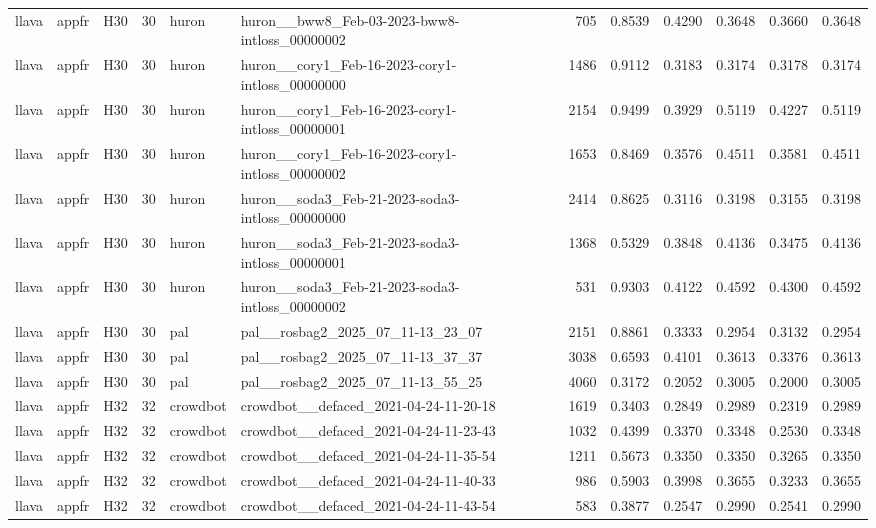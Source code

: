 \begin{table}[tbp]
\begin{tabular}{lllrllrrrrrr}
llava & appfr & H30 & 30 & huron & huron\_\_bww8\_Feb-03-2023-bww8-intloss\_00000002 & 705 & 0.8539 & 0.4290 & 0.3648 & 0.3660 & 0.3648 \\
llava & appfr & H30 & 30 & huron & huron\_\_cory1\_Feb-16-2023-cory1-intloss\_00000000 & 1486 & 0.9112 & 0.3183 & 0.3174 & 0.3178 & 0.3174 \\
llava & appfr & H30 & 30 & huron & huron\_\_cory1\_Feb-16-2023-cory1-intloss\_00000001 & 2154 & 0.9499 & 0.3929 & 0.5119 & 0.4227 & 0.5119 \\
llava & appfr & H30 & 30 & huron & huron\_\_cory1\_Feb-16-2023-cory1-intloss\_00000002 & 1653 & 0.8469 & 0.3576 & 0.4511 & 0.3581 & 0.4511 \\
llava & appfr & H30 & 30 & huron & huron\_\_soda3\_Feb-21-2023-soda3-intloss\_00000000 & 2414 & 0.8625 & 0.3116 & 0.3198 & 0.3155 & 0.3198 \\
llava & appfr & H30 & 30 & huron & huron\_\_soda3\_Feb-21-2023-soda3-intloss\_00000001 & 1368 & 0.5329 & 0.3848 & 0.4136 & 0.3475 & 0.4136 \\
llava & appfr & H30 & 30 & huron & huron\_\_soda3\_Feb-21-2023-soda3-intloss\_00000002 & 531 & 0.9303 & 0.4122 & 0.4592 & 0.4300 & 0.4592 \\
llava & appfr & H30 & 30 & pal & pal\_\_rosbag2\_2025\_07\_11-13\_23\_07 & 2151 & 0.8861 & 0.3333 & 0.2954 & 0.3132 & 0.2954 \\
llava & appfr & H30 & 30 & pal & pal\_\_rosbag2\_2025\_07\_11-13\_37\_37 & 3038 & 0.6593 & 0.4101 & 0.3613 & 0.3376 & 0.3613 \\
llava & appfr & H30 & 30 & pal & pal\_\_rosbag2\_2025\_07\_11-13\_55\_25 & 4060 & 0.3172 & 0.2052 & 0.3005 & 0.2000 & 0.3005 \\
llava & appfr & H32 & 32 & crowdbot & crowdbot\_\_defaced\_2021-04-24-11-20-18 & 1619 & 0.3403 & 0.2849 & 0.2989 & 0.2319 & 0.2989 \\
llava & appfr & H32 & 32 & crowdbot & crowdbot\_\_defaced\_2021-04-24-11-23-43 & 1032 & 0.4399 & 0.3370 & 0.3348 & 0.2530 & 0.3348 \\
llava & appfr & H32 & 32 & crowdbot & crowdbot\_\_defaced\_2021-04-24-11-35-54 & 1211 & 0.5673 & 0.3350 & 0.3350 & 0.3265 & 0.3350 \\
llava & appfr & H32 & 32 & crowdbot & crowdbot\_\_defaced\_2021-04-24-11-40-33 & 986 & 0.5903 & 0.3998 & 0.3655 & 0.3233 & 0.3655 \\
llava & appfr & H32 & 32 & crowdbot & crowdbot\_\_defaced\_2021-04-24-11-43-54 & 583 & 0.3877 & 0.2547 & 0.2990 & 0.2541 & 0.2990 \\

\end{tabular}
\end{table}
